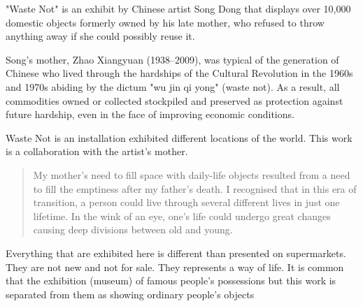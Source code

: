 "Waste Not" is an exhibit by Chinese artist Song Dong that displays over 10,000 domestic objects formerly owned by his late mother, who refused to throw anything away if she could possibly reuse it. 

Song’s mother, Zhao Xiangyuan (1938–2009), was typical of the generation of Chinese who lived through the hardships of the Cultural Revolution in the 1960s and 1970s abiding by the dictum "wu jin qi yong" (waste not). As a result, all commodities owned or collected stockpiled and preserved as protection against future hardship, even in the face of improving economic conditions.

Waste Not is an installation exhibited different locations of the world. This work is a collaboration with the artist’s mother.



\begin{quote}
My mother's need to fill space with daily-life objects resulted from a need to fill the emptiness after my father's death. I recognised that in this era of transition, a person could live through several different lives in just one lifetime. In the wink of an eye, one's life could undergo great changes causing deep divisions between old and young.
\end{quote}

Everything that are exhibited here is different than presented on supermarkets. They are not new and not for sale. They represents a way of life. It is common that the exhibition (museum) of famous people's possessions but this work is separated from them as showing ordinary people's objects

